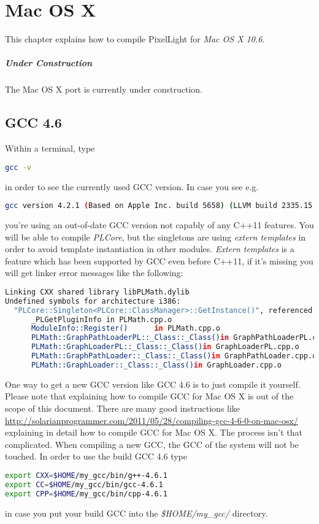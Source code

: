 \chapter{Mac OS X}
This chapter explains how to compile PixelLight for \emph{Mac OS X 10.6}.


\paragraph{Under Construction}
The Mac OS X port is currently under construction.




\section{\ac{GCC} 4.6}
Within a terminal, type
\begin{lstlisting}[language=sh]
gcc -v
\end{lstlisting}
in order to see the currently used \ac{GCC} version. In case you see e.g.
\begin{lstlisting}[language=sh]
gcc version 4.2.1 (Based on Apple Inc. build 5658) (LLVM build 2335.15.00)
\end{lstlisting}
you're using an out-of-date \ac{GCC} version not capably of any C++11 features. You will be able to compile \emph{PLCore}, but the singletons are using \emph{extern templates} in order to avoid template instantiation in other modules. \emph{Extern templates} is a feature which has been supported by \ac{GCC} even before C++11, if it's missing you will get linker error messages like the following:
\begin{lstlisting}[language=sh]
Linking CXX shared library libPLMath.dylib
Undefined symbols for architecture i386:
  "PLCore::Singleton<PLCore::ClassManager>::GetInstance()", referenced from:
      _PLGetPluginInfo in PLMath.cpp.o
      ModuleInfo::Register()      in PLMath.cpp.o
      PLMath::GraphPathLoaderPL::_Class::_Class()in GraphPathLoaderPL.cpp.o
      PLMath::GraphLoaderPL::_Class::_Class()in GraphLoaderPL.cpp.o
      PLMath::GraphPathLoader::_Class::_Class()in GraphPathLoader.cpp.o
      PLMath::GraphLoader::_Class::_Class()in GraphLoader.cpp.o
\end{lstlisting}

One way to get a new \ac{GCC} version like \ac{GCC} 4.6 is to just compile it yourself. Please note that explaining how to compile \ac{GCC} for Mac OS X is out of the scope of this document. There are many good instructions like \url{http://solarianprogrammer.com/2011/05/28/compiling-gcc-4-6-0-on-mac-osx/} explaining in detail how to compile \ac{GCC} for Mac OS X. The process isn't that complicated. When compiling a new \ac{GCC}, the \ac{GCC} of the system will not be touched. In order to use the build \ac{GCC} 4.6 type
\begin{lstlisting}[language=sh]
export CXX=$HOME/my_gcc/bin/g++-4.6.1
export CC=$HOME/my_gcc/bin/gcc-4.6.1
export CPP=$HOME/my_gcc/bin/cpp-4.6.1
\end{lstlisting}
in case you put your build \ac{GCC} into the \emph{\$HOME/my\_gcc/} directory.

